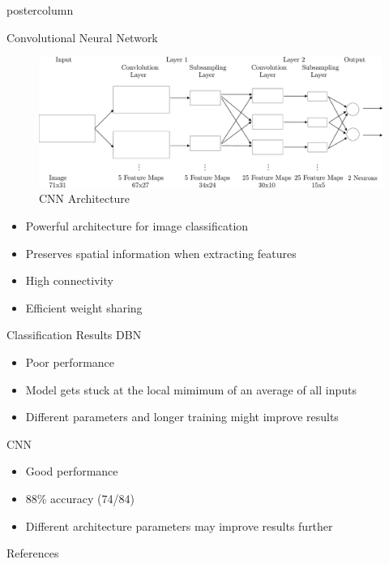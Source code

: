\documentclass[final]{beamer}
\begin{document}
\begin{frame}
\begin{columns}
\begin{column}{.33\textwidth}
\begin{beamercolorbox}[center,wd=\textwidth]{postercolumn}
\begin{minipage}[T]{.95\textwidth}
{            \vfill
            \begin{block}{Convolutional Neural Network}
            \begin{figure}[htbp]
               \centering
               \includegraphics[height=5\baselineskip]{cnnarch} %
               \caption{CNN Architecture}
            \end{figure}
            \begin{itemize}
                \item Powerful architecture for image classification
                \item Preserves spatial information when extracting features
                \item High connectivity
                \item Efficient weight sharing
            \end{itemize}
            \end{block}
            \vfill
            \begin{block}{Classification Results}
              DBN
              \begin{itemize}
                \item Poor performance
                \item Model gets stuck at the local mimimum of an average of all
                inputs
                \item Different parameters and longer training might improve
                results
              \end{itemize}
             \bigskip
             CNN
             \begin{itemize}
                \item Good performance
                \item 88\% accuracy (74/84)
                \item Different architecture parameters may improve results
                further
             \end{itemize}
            \end{block}
            \vfill
            \begin{block}{References}
              \nocite{Xiao:2008vn}
              \nocite{Tao:2008bh}
	    \nocite{Kittler:1986zr}
	    \nocite{Ila05}
             \def\newblock{}\small
	    
  	    
	    

\end{block}}
\end{minipage}
\end{beamercolorbox}
\end{column}
\end{columns}
\end{frame}
\end{document}
